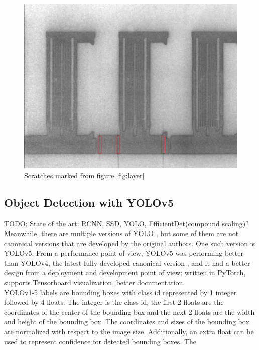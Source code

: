 \begin{figure}[ht]
  \includegraphics[width=\textwidth]{images/layer_00325_marked_cropped}
  \centering
  \caption{Scratches marked from figure \ref{fig:layer}}
  \label{fig:layer_00325_marked_cropped}
\end{figure}


\subsection{Object Detection with YOLOv5}
TODO: State of the art: RCNN, SSD, YOLO, EfficientDet(compound scaling)? \\
Meanwhile, there are multiple versions of YOLO \cite{yolov4_paper, yolov5_git, yolov7_paper}, but some of them are not canonical versions that are developed by the original authors. One such version is YOLOv5. From a performance point of view, YOLOv5 was performing better than YOLOv4, the latest fully developed canonical version \cite{yolov7_paper}, and it had a better design from a deployment and development point of view: written in PyTorch, supports Tensorboard visualization, better documentation. \\
YOLOv1-5 labels are bounding boxes with class id represented by 1 integer followed by 4 floats. The integer is the class id, the first 2 floats are the coordinates of the center of the bounding box and the next 2 floats are the width and height of the bounding box. The coordinates and sizes of the bounding box are normalized with respect to the image size. Additionally, an extra float can be used to represent confidence for detected bounding boxes.
The

